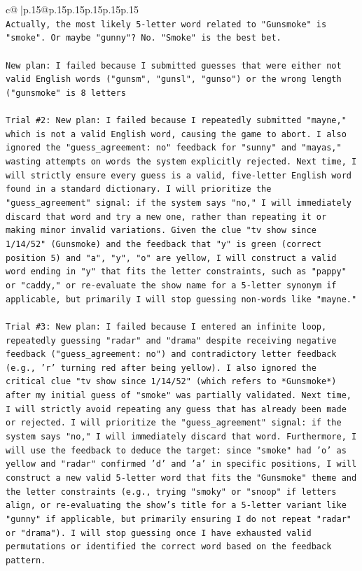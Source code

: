 \documentclass{article}
\begin{document}
{\begin{supertabular}{c@{$\;$}|p{.15\linewidth}@{}p{.15\linewidth}p{.15\linewidth}p{.15\linewidth}p{.15\linewidth}p{.15\linewidth}}
{{{\\ 
\texttt{Actually, the most likely 5{-}letter word related to "Gunsmoke" is "smoke". Or maybe "gunny"? No. "Smoke" is the best bet.} \\
\\ 
\texttt{New plan: I failed because I submitted guesses that were either not valid English words ("gunsm", "gunsl", "gunso") or the wrong length ("gunsmoke" is 8 letters} \\
\\ 
\texttt{Trial \#2: New plan: I failed because I repeatedly submitted "mayne," which is not a valid English word, causing the game to abort. I also ignored the "guess\_agreement: no" feedback for "sunny" and "mayas," wasting attempts on words the system explicitly rejected. Next time, I will strictly ensure every guess is a valid, five{-}letter English word found in a standard dictionary. I will prioritize the "guess\_agreement" signal: if the system says "no," I will immediately discard that word and try a new one, rather than repeating it or making minor invalid variations. Given the clue "tv show since 1/14/52" (Gunsmoke) and the feedback that "y" is green (correct position 5) and "a", "y", "o" are yellow, I will construct a valid word ending in "y" that fits the letter constraints, such as "pappy" or "caddy," or re{-}evaluate the show name for a 5{-}letter synonym if applicable, but primarily I will stop guessing non{-}words like "mayne."} \\
\\ 
\texttt{Trial \#3: New plan: I failed because I entered an infinite loop, repeatedly guessing "radar" and "drama" despite receiving negative feedback ("guess\_agreement: no") and contradictory letter feedback (e.g., 'r' turning red after being yellow). I also ignored the critical clue "tv show since 1/14/52" (which refers to *Gunsmoke*) after my initial guess of "smoke" was partially validated. Next time, I will strictly avoid repeating any guess that has already been made or rejected. I will prioritize the "guess\_agreement" signal: if the system says "no," I will immediately discard that word. Furthermore, I will use the feedback to deduce the target: since "smoke" had 'o' as yellow and "radar" confirmed 'd' and 'a' in specific positions, I will construct a new valid 5{-}letter word that fits the "Gunsmoke" theme and the letter constraints (e.g., trying "smoky" or "snoop" if letters align, or re{-}evaluating the show's title for a 5{-}letter variant like "gunny" if applicable, but primarily ensuring I do not repeat "radar" or "drama"). I will stop guessing once I have exhausted valid permutations or identified the correct word based on the feedback pattern.} \\
}}}
\end{supertabular}}
\end{document}
